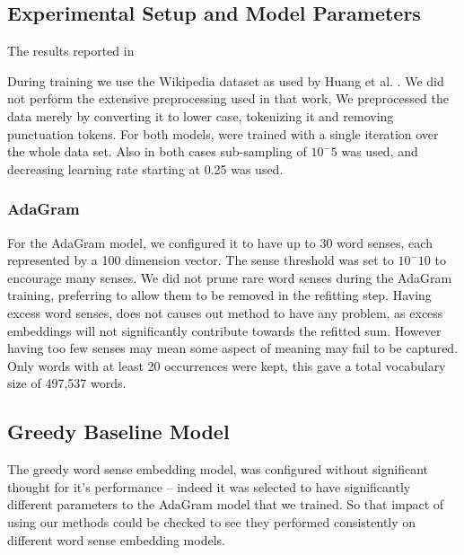 \documentclass{sig-alternate}
\begin{document}
\subsection{Experimental Setup and Model Parameters}

The results reported in 


During training we use the Wikipedia dataset as used by Huang et al. \parencite{Huang2012}.
We did not perform the extensive preprocessing used in that work, 
We preprocessed the data merely by converting it to lower case, tokenizing it and removing punctuation tokens.
For both models, were trained with a single iteration over the whole data set.
Also in both cases sub-sampling of $10^-5$ was used, and decreasing learning rate starting at 0.25 was used.


\subsubsection{AdaGram}
For the AdaGram model, we configured it to have up to 30 word senses, each represented by a 100 dimension vector. The sense threshold was set to $10^-10$ to encourage many senses.
We did not prune rare word senses during the AdaGram training, preferring to allow them to be removed in the refitting step.
Having excess word senses, does not causes out method to have any problem, as excess embeddings will not significantly contribute towards the refitted sum.
However having too few senses may mean some aspect of meaning may fail to be captured.
Only words with at least 20 occurrences were kept, this gave a total vocabulary size of 497,537 words.



\subsection{Greedy Baseline Model}
The greedy word sense embedding model, was configured without significant thought for it's performance -- indeed it was selected to have significantly different parameters to the AdaGram model that we trained. So that impact of using our methods could be checked to see they performed consistently on different word sense embedding models.
\end{document}
